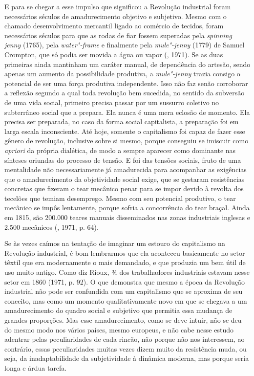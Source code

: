 E para se chegar a esse impulso que significou a Revolução industrial
foram necessários séculos de amadurecimento objetivo e subjetivo. Mesmo
com o chamado desenvolvimento mercantil ligado ao comércio de tecidos,
foram necessários séculos para que as rodas de fiar fossem superadas
pela \emph{spinning jenny} (1765), pela \emph{water"-frame} e finalmente
pela \emph{mule"-jenny} (1779) de Samuel Crompton, que só podia ser
movida a água ou vapor (, 1971). Se as duas primeiras ainda
mantinham um caráter manual, de dependência do artesão, sendo apenas um
aumento da possibilidade produtiva, a \emph{mule"-jenny} trazia consigo o
potencial de ser uma força produtiva independente. Isso não faz senão
corroborar a reflexão segundo a qual toda revolução bem sucedida, no
sentido da subversão de uma vida social, primeiro precisa passar por um
sussurro coletivo no subterrâneo social que a prepara. Ela nunca é uma
mera eclosão de momento. Ela precisa ser preparada, no caso da forma
social capitalista, a preparação foi em larga escala inconsciente. Até
hoje, somente o capitalismo foi capaz de fazer esse gênero de revolução,
inclusive sobre si mesmo, porque conseguiu se imiscuir como
\emph{apriori} da própria dialética, de modo a sempre aparecer como
dominante nas sínteses oriundas do processo de tensão. E foi das tensões
sociais, fruto de uma mentalidade não necessariamente já amadurecida
para acompanhar as exigências que o amadurecimento da objetividade
social exige, que se gestaram resistências concretas que fizeram o tear
mecânico penar para se impor devido à revolta dos tecelões que temiam
desemprego. Mesmo com seu potencial produtivo, o tear mecânico se impôs
lentamente, porque sofria a concorrência do tear braçal. Ainda em 1815,
são 200.000 teares manuais disseminados nas zonas industriais inglesas e
2.500 mecânicos (, 1971, p. 64).

Se às vezes caímos na tentação de imaginar um estouro do capitalismo na
Revolução industrial, é bom lembrarmos que ela aconteceu basicamente no
setor têxtil que era modernamente o mais demandado, e que produzia um
bem útil de uso muito antigo. Como diz Rioux, ¾ dos trabalhadores
industriais estavam nesse setor em 1860 (1971, p. 92). O que
demonstra que mesmo a época da Revolução industrial não pode ser
confundida com um capitalismo que se aproxima de seu conceito, mas como
um momento qualitativamente novo em que se chegava a um amadurecimento
do quadro social e subjetivo que permitia essa mudança de grandes
proporções. Mas esse amadurecimento, como se deve intuir, não se deu do
mesmo modo nos vários países, mesmo europeus, e não cabe nesse
estudo adentrar pelas peculiaridades de cada rincão, não porque não nos
interessem, ao contrário, essas peculiaridades muitas vezes dizem muito
da resistência muda, ou seja, da inadaptabilidade da subjetividade à
dinâmica moderna, mas porque seria longa e árdua tarefa.

